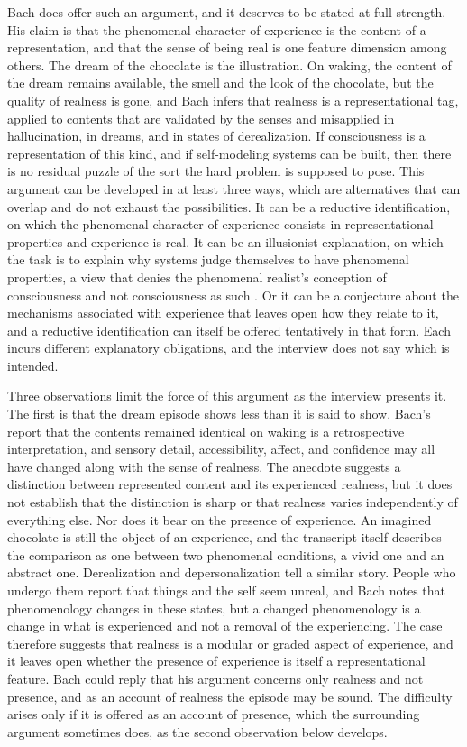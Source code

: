 \documentclass[11pt]{article}
\begin{document}
Bach does offer such an argument, and it deserves to be stated at full strength. His claim is that the phenomenal character of experience is the content of a representation, and that the sense of being real is one feature dimension among others. The dream of the chocolate is the illustration. On waking, the content of the dream remains available, the smell and the look of the chocolate, but the quality of realness is gone, and Bach infers that realness is a representational tag, applied to contents that are validated by the senses and misapplied in hallucination, in dreams, and in states of derealization. If consciousness is a representation of this kind, and if self-modeling systems can be built, then there is no residual puzzle of the sort the hard problem is supposed to pose. This argument can be developed in at least three ways, which are alternatives that can overlap and do not exhaust the possibilities. It can be a reductive identification, on which the phenomenal character of experience consists in representational properties and experience is real. It can be an illusionist explanation, on which the task is to explain why systems judge themselves to have phenomenal properties, a view that denies the phenomenal realist's conception of consciousness and not consciousness as such \cite{frankish2016,chalmers2018}. Or it can be a conjecture about the mechanisms associated with experience that leaves open how they relate to it, and a reductive identification can itself be offered tentatively in that form. Each incurs different explanatory obligations, and the interview does not say which is intended.

Three observations limit the force of this argument as the interview presents it. The first is that the dream episode shows less than it is said to show. Bach's report that the contents remained identical on waking is a retrospective interpretation, and sensory detail, accessibility, affect, and confidence may all have changed along with the sense of realness. The anecdote suggests a distinction between represented content and its experienced realness, but it does not establish that the distinction is sharp or that realness varies independently of everything else. Nor does it bear on the presence of experience. An imagined chocolate is still the object of an experience, and the transcript itself describes the comparison as one between two phenomenal conditions, a vivid one and an abstract one. Derealization and depersonalization tell a similar story. People who undergo them report that things and the self seem unreal, and Bach notes that phenomenology changes in these states, but a changed phenomenology is a change in what is experienced and not a removal of the experiencing. The case therefore suggests that realness is a modular or graded aspect of experience, and it leaves open whether the presence of experience is itself a representational feature. Bach could reply that his argument concerns only realness and not presence, and as an account of realness the episode may be sound. The difficulty arises only if it is offered as an account of presence, which the surrounding argument sometimes does, as the second observation below develops.
\end{document}
